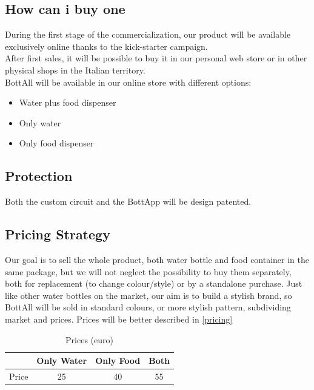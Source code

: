 \subsection{How can i buy one}
During the first stage of the commercialization, our product will be available exclusively online thanks to the kick-starter campaign.\\
After first sales, it will be possible to buy it in our personal web store or in other physical shops in the Italian territory.\\
BottAll will be available in our online store with different options:
\begin{itemize}
\item Water plus food dispenser 
\item Only water 
\item Only food dispenser
\end{itemize}
\subsection{Protection}
Both the custom circuit and the BottApp will be design patented.
\subsection{Pricing Strategy}
Our goal is to sell the whole product, both water bottle and food container in the same package, but we will not neglect the possibility to buy them separately, both for replacement (to change colour/style) or by a standalone purchase. Just like other water bottles on the market, our aim is to build a stylish brand, so BottAll will be sold in standard colours, or more stylish pattern, subdividing market and prices. Prices will be better described in \cref{pricing}

\begin{table}[H]
\centering
\caption{Prices (euro)}
\begin{tabular}{cccc}
\toprule
& Only Water & Only Food & Both\\
\hline
Price & 25 & 40 & 55 \\
\bottomrule
\end{tabular}
\end{table}

